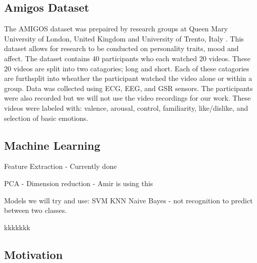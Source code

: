 \subsection{Amigos Dataset}
The AMIGOS dataset was prepaired by research groups at
Queen Mary University of London, United Kingdom and
University of Trento, Italy \cite{AMIGOS:2018}.
This dataset allows for research to be conducted on
personality traits, mood and affect.
The dataset contains 40 participants who each watched 20 videos.
These 20 videos are split into two catagories; long and short.
Each of these catagories are furthsplit into
wheather the participant watched the video alone or within a group.
Data was collected using ECG, EEG, and GSR sensors.
The participants were also recorded but we will not use the video recordings
for our work.
These videos were labeled with:
valence, arousal, control, familiarity, like/dislike,
and selection of basic emotions.

\subsection{Machine Learning}
Feature Extraction - Currently done

PCA - Dimension reduction - Amir is using this

Models we will try and use:
SVM
KNN
Naive Bayes - not recognition to predict between two classes.

kkkkkkk




\subsection{Motivation}

